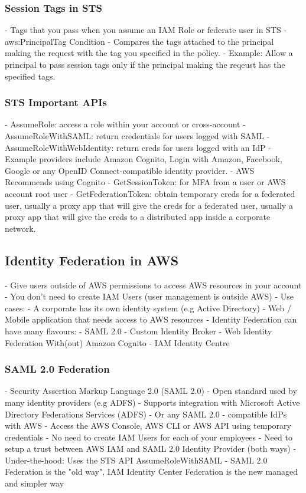 \documentclass[11pt]{book}
\begin{document}
    \subsubsection{Session Tags in STS}
    - Tags that you pass when you assume an IAM Role or federate user in STS
    - aws:PrincipalTag Condition
    - Compares the tags attached to the principal making the request with the tag you specified in the policy.
    - Example: Allow a principal to pass session tags only if the principal making the reqeust has the specified tags.

    \subsubsection{STS Important APIs}
    - AssumeRole: access a role within your account or cross-account
    - AssumeRoleWithSAML: return credentials for users logged with SAML
    - AssumeRoleWithWebIdentity: return creds for users logged with an IdP
    - Example providers include Amazon Cognito, Login with Amazon, Facebook, Google or any OpenID Connect-compatible identity provider.
    - AWS Recommends using Cognito
    - GetSessionToken: for MFA from a user or AWS account root user
    - GetFederationToken: obtain temporary creds for a federated user, usually a proxy app that will give the creds for a federated user, usually a proxy app that will give the creds to a distributed app inside a corporate network.

    \subsection{Identity Federation in AWS}
    - Give users outside of AWS permissions to access AWS resources in your account
    - You don't need to create IAM Users (user management is outside AWS)
    - Use cases:
    - A corporate has its own identity system (e.g Active Directory)
    - Web / Mobile application that needs access to AWS resources
    - Identity Federation can have many flavours:
    - SAML 2.0
    - Custom Identity Broker
    - Web Identity Federation With(out) Amazon Cognito
    - IAM Identity Centre

    \subsubsection{SAML 2.0 Federation}
    - Security Assertion Markup Language 2.0 (SAML 2.0)
    - Open standard used by many identity providers (e.g ADFS)
    - Supports integration with Microsoft Active Directory Federations Services (ADFS)
    - Or any SAML 2.0 - compatible IdPs with AWS
    - Access the AWS Console, AWS CLI or AWS API using temporary credentials
    - No need to create IAM Users for each of your employees
    - Need to setup a trust between AWS IAM and SAML 2.0 Identity Provider (both ways)
    - Under-the-hood: Uses the STS API AssumeRoleWithSAML
    - SAML 2.0 Federation is the "old way", IAM Identity Center Federation is the new managed and simpler way
\end{document}
